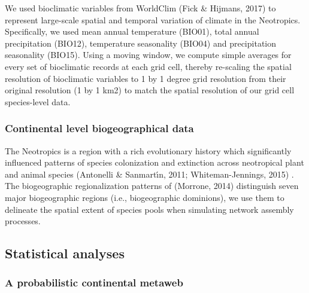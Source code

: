 \documentclass[
]{agujournal2019}
\begin{document}
We used bioclimatic variables from WorldClim (Fick \& Hijmans, 2017) to
represent large-scale spatial and temporal variation of climate in the
Neotropics. Specifically, we used mean annual temperature (BIO01), total
annual precipitation (BIO12), temperature seasonality (BIO04) and
precipitation seasonality (BIO15). Using a moving window, we compute
simple averages for every set of bioclimatic records at each grid cell,
thereby re-scaling the spatial resolution of bioclimatic variables to 1
by 1 degree grid resolution from their original resolution (1 by 1 km2)
to match the spatial resolution of our grid cell species-level data.

\subsubsection{Continental level biogeographical
data}\label{continental-level-biogeographical-data}

The Neotropics is a region with a rich evolutionary history which
significantly influenced patterns of species colonization and extinction
across neotropical plant and animal species (Antonelli \& Sanmartı́n,
2011; Whiteman-Jennings, 2015) . The biogeographic regionalization
patterns of (Morrone, 2014) distinguish seven major biogeographic
regions (i.e., biogeographic dominions), we use them to delineate the
spatial extent of species pools when simulating network assembly
processes.

\subsection{Statistical analyses}\label{statistical-analyses}

\subsubsection{A probabilistic continental
metaweb}\label{a-probabilistic-continental-metaweb}
\end{document}
